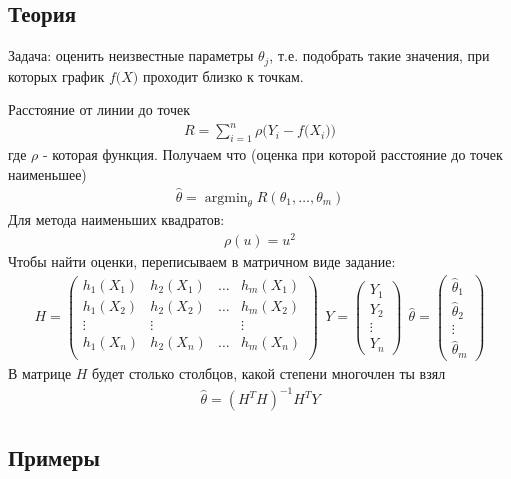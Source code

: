 \documentclass[12pt]{extarticle}
\DeclareMathOperator*{\argmin}{argmin}   %
\begin{document}
\subsection{Теория}
Задача: оценить неизвестные параметры $\theta_{j}$, т.е. подобрать такие
значения, при которых график $f\big(X\big)$ проходит близко к точкам.
\par Расстояние от линии до точек
\begin{eqnarray*}
    R=\sum\limits_{i=1}^{n}\rho\Big(Y_{i}-f\big(X_{i}\big)\Big)
\end{eqnarray*}
где $\rho$ - которая функция. Получаем что (оценка при которой расстояние до
точек наименьшее)
\begin{eqnarray*}
    \hat{\theta}=\argmin_{\theta}R(\theta_{1},\ldots,\theta_{m})
\end{eqnarray*}
Для метода наименьших квадратов:
\begin{eqnarray*}
    \rho(u)=u^{2}
\end{eqnarray*}
Чтобы найти оценки, переписываем в матричном виде задание:
\begin{eqnarray*}
H=
\left( \begin{array}{cccc}
        h_{1}(X_{1}) & h_{2}(X_{1})&\ldots&h_{m}(X_{1})\\
        h_{1}(X_{2}) & h_{2}(X_{2})&\ldots&h_{m}(X_{2})\\
        \vdots       & \vdots& &\vdots \\
        h_{1}(X_{n}) & h_{2}(X_{n})&\ldots&h_{m}(X_{n})\\
\end{array} \right)
\ \ Y=
\left( \begin{array}{c}
        Y_{1}\\Y_{2}\\\vdots\\Y_{n}
\end{array} \right)
\ \ \hat{\theta}=
\left( \begin{array}{c}
        \hat{\theta}_{1}\\
        \hat{\theta}_{2}\\
        \vdots\\
        \hat{\theta}_{m}
\end{array} \right)
\end{eqnarray*}
В матрице $H$ будет столько столбцов, какой степени многочлен ты взял
\begin{eqnarray*}
\hat{\theta}=(H^{T}H)^{-1}H^{T}Y
\end{eqnarray*}

\subsection{Примеры}
\end{document}
